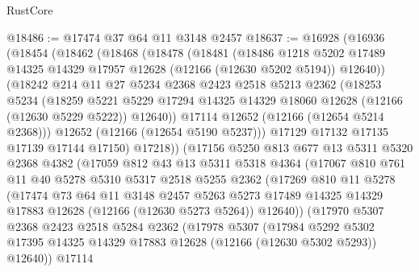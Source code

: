 \begin{lexlean}{RustCore}
\begin{coremodule}
@18486 := @17474 @37 @64 @11 @3148 @2457
@18637 := @16928
    (@16936
      (@18454
        (@18462
          (@18468
            (@18478
              (@18481
                (@18486
                  @1218
                  @5202
                  @17489
                  @14325
                  @14329
                  @17957
                  @12628
                  (@12166 (@12630 @5202 @5194))
                  @12640))
              (@18242
                @214
                @11
                @27
                @5234
                @2368
                @2423
                @2518
                @5213
                @2362
                (@18253
                  @5234
                  (@18259
                    @5221
                    @5229
                    @17294
                    @14325
                    @14329
                    @18060
                    @12628
                    (@12166 (@12630 @5229 @5222))
                    @12640))
                @17114
                @12652
                (@12166 (@12654 @5214 @2368)))
              @12652
              (@12166 (@12654 @5190 @5237)))
            @17129
            @17132
            @17135
            @17139
            @17144
            @17150)
          @17218))
      (@17156
        @5250
        @813
        @677
        @13
        @5311
        @5320
        @2368
        @4382
        (@17059
          @812
          @43
          @13
          @5311
          @5318
          @4364
          (@17067
            @810
            @761
            @11
            @40
            @5278
            @5310
            @5317
            @2518
            @5255
            @2362
            (@17269
              @810
              @11
              @5278
              (@17474
                @73
                @64
                @11
                @3148
                @2457
                @5263
                @5273
                @17489
                @14325
                @14329
                @17883
                @12628
                (@12166 (@12630 @5273 @5264))
                @12640))
            (@17970
              @5307
              @2368
              @2423
              @2518
              @5284
              @2362
              (@17978
                @5307
                (@17984
                  @5292
                  @5302
                  @17395
                  @14325
                  @14329
                  @17883
                  @12628
                  (@12166 (@12630 @5302 @5293))
                  @12640))
              @17114

\end{coremodule}
\end{lexlean}
